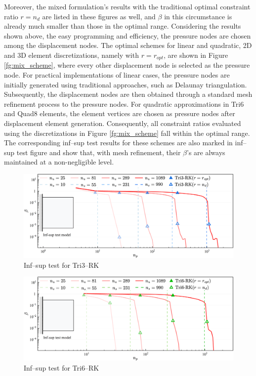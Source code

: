 Moreover, the mixed formulation's results with the traditional optimal constraint ratio $r=n_d$ are listed in these figures as well, and $\beta$ in this circumstance is already much smaller than those in the optimal range. Considering the results shown above, the easy programming and efficiency, the pressure nodes are chosen among the displacement nodes.
The optimal schemes for linear and quadratic, 2D and 3D element discretizations, namely with $r=r_{opt}$, are shown in Figure \ref{fg:mix_scheme},
where every other displacement node is selected as the pressure node.
For practical implementations of linear cases, the pressure nodes are initially generated using traditional approaches, such as Delaunay triangulation.
Subsequently, the displacement nodes are then obtained through a standard mesh refinement process to the pressure nodes.
For quadratic approximations in Tri6 and Quad8 elements, the element vertices are chosen as pressure nodes after displacement element generation.
Consequently, all constraint ratios evaluated using the discretizations in Figure \ref{fg:mix_scheme} fall within the optimal range.
The corresponding inf--sup test results for these schemes are also marked in inf--sup test figure and show that, with mesh refinement, their $\beta$'s are always maintained at a non-negligible level.

\begin{figure}[H]
\centering
\includegraphics[width=\textwidth]{png/tri3.png}
\caption{Inf--sup test for Tri3--RK}\label{fg:infsup_convergence_2D_a}
\end{figure}

\begin{figure}[H]
\centering
\includegraphics[width=\textwidth]{png/tri6.png}\caption{Inf--sup test for Tri6--RK}\label{fg:infsup_convergence_2D_b}
\end{figure}

